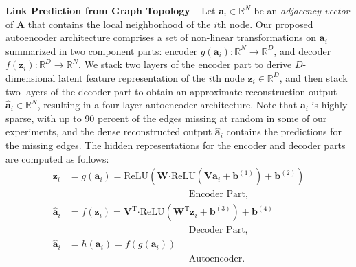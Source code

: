\documentclass[letterpaper, conference]{IEEEtran}  %
\begin{document}
\noindent \textbf{Link Prediction from Graph Topology} ~ Let $\mathbf{a}_i \in \mathbb{R}^N$ be an \emph{adjacency vector} of $\mathbf{A}$ that contains the local neighborhood of the $i$th node. Our proposed autoencoder architecture comprises a set of non-linear transformations on $\mathbf{a}_i$ summarized in two component parts: encoder $g(\mathbf{a}_i)\colon \mathbb{R}^N \to \mathbb{R}^D$, and decoder $f(\mathbf{z}_i)\colon \mathbb{R}^D \to \mathbb{R}^N$. We stack two layers of the encoder part to derive $D$-dimensional latent feature representation of the $i$th node $\mathbf{z}_i \in \mathbb{R}^D$, and then stack two layers of the decoder part to obtain an approximate reconstruction output $\mathbf{\hat{a}}_i \in \mathbb{R}^N$, resulting in a four-layer autoencoder architecture. Note that $\mathbf{a}_i$ is highly sparse, with up to 90 percent of the edges missing at random in some of our experiments, and the dense reconstructed output $\mathbf{\hat{a}}_i$ contains the predictions for the missing edges. The hidden representations for the encoder and decoder parts are computed as follows:
\begin{align*}
\mathbf{z}_i &= g\left(\mathbf{a}_i\right) = \text{ReLU}\left(\mathbf{W} \boldsymbol{\cdot} \text{ReLU}\left(\mathbf{V}\mathbf{a}_i + \mathbf{b}^{(1)}\right) + \mathbf{b}^{(2)}\right) \\ &\hspace{150pt} \text{Encoder Part}, \\
\mathbf{\hat{a}}_i &= f\left(\mathbf{z}_i\right) = \mathbf{V}^\text{T} \boldsymbol{\cdot} \text{ReLU}\left(\mathbf{W}^\text{T}\mathbf{z}_i + \mathbf{b}^{(3)}\right) + \mathbf{b}^{(4)} \\ &\hspace{150pt} \text{Decoder Part}, \\
\mathbf{\hat{a}}_i &= h\left(\mathbf{a}_i\right) = f\left(g\left(\mathbf{a}_i\right)\right) \\ &\hspace{150pt} \text{Autoencoder}.
\end{align*}
\end{document}

